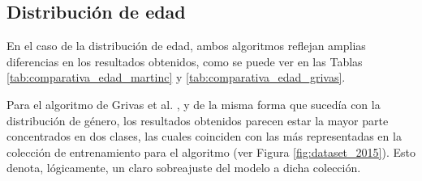\bigskip
\begin{table}[H]
	\centering
	\caption{Distribución de género obtenida por ambos algoritmos}
	\label{tab:comparativa_genero}
\end{table}

\subsection{Distribución de edad}
\label{subsec:casouso_analisis_edad}

En el caso de la distribución de edad, ambos algoritmos reflejan amplias diferencias en los resultados obtenidos, como se puede
ver en las Tablas \ref{tab:comparativa_edad_martinc} y \ref{tab:comparativa_edad_grivas}.

\bigskip
Para el algoritmo de Grivas et al. \cite{grivas2015author}, y de la misma forma que sucedía con la distribución de género, los resultados obtenidos
parecen estar la mayor parte concentrados en dos clases, las cuales coinciden con las más representadas en la colección de entrenamiento para el algoritmo (ver Figura \ref{fig:dataset_2015}).
Esto denota, lógicamente, un claro sobreajuste del modelo a dicha colección. 

